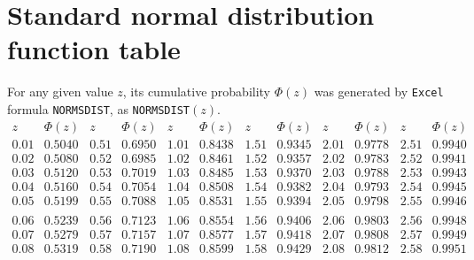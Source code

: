 \section{Standard normal distribution function table}\label{S:NormalDFTable}
{\scriptsize{
For any given value $z$, its cumulative probability $\Phi(z)$ was generated by {\tt Excel} formula {\tt NORMSDIST}, as {\tt NORMSDIST}$(z)$.
$$
 \begin{array}{|c|c|c|c|c|c|c|c|c|c|c|c|}\hline
z       &       \Phi(z) &       z       &       \Phi(z) &       z       &       \Phi(z) &       z       &       \Phi(z) &       z       &       \Phi(z) &       z       &       \Phi(z) \\ \hline
0.01    &       0.5040  &       0.51    &       0.6950  &       1.01    &       0.8438  &       1.51    &       0.9345  &       2.01    &       0.9778  &       2.51    &       0.9940  \\
0.02    &       0.5080  &       0.52    &       0.6985  &       1.02    &       0.8461  &       1.52    &       0.9357  &       2.02    &       0.9783  &       2.52    &       0.9941  \\
0.03    &       0.5120  &       0.53    &       0.7019  &       1.03    &       0.8485  &       1.53    &       0.9370  &       2.03    &       0.9788  &       2.53    &       0.9943  \\
0.04    &       0.5160  &       0.54    &       0.7054  &       1.04    &       0.8508  &       1.54    &       0.9382  &       2.04    &       0.9793  &       2.54    &       0.9945  \\
0.05    &       0.5199  &       0.55    &       0.7088  &       1.05    &       0.8531  &       1.55    &       0.9394  &       2.05    &       0.9798  &       2.55    &       0.9946  \\
&&&&&&&&&&&\\
0.06    &       0.5239  &       0.56    &       0.7123  &       1.06    &       0.8554  &       1.56    &       0.9406  &       2.06    &       0.9803  &       2.56    &       0.9948  \\
0.07    &       0.5279  &       0.57    &       0.7157  &       1.07    &       0.8577  &       1.57    &       0.9418  &       2.07    &       0.9808  &       2.57    &       0.9949  \\
0.08    &       0.5319  &       0.58    &       0.7190  &       1.08    &       0.8599  &       1.58    &       0.9429  &       2.08    &       0.9812  &       2.58    &       0.9951  \\

\end{array}$$}}

